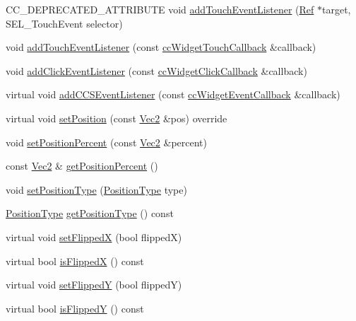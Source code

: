 \begin{DoxyCompactItemize}
\item 
C\+C\+\_\+\+D\+E\+P\+R\+E\+C\+A\+T\+E\+D\+\_\+\+A\+T\+T\+R\+I\+B\+U\+TE void \hyperlink{classui_1_1Widget_a5265726a03f69c3bc8dc65420070c41a}{add\+Touch\+Event\+Listener} (\hyperlink{classRef}{Ref} $\ast$target, S\+E\+L\+\_\+\+Touch\+Event selector)
\item 
void \hyperlink{classui_1_1Widget_a13169efe07b00813c563f56a5753acfe}{add\+Touch\+Event\+Listener} (const \hyperlink{classui_1_1Widget_a4f2987649ba5a33d1edb8b13279b03c9}{cc\+Widget\+Touch\+Callback} \&callback)
\item 
void \hyperlink{classui_1_1Widget_a840938728aeeca3152490620ab1952d1}{add\+Click\+Event\+Listener} (const \hyperlink{classui_1_1Widget_a01110bd071334e41c48ee0bec593db61}{cc\+Widget\+Click\+Callback} \&callback)
\item 
virtual void \hyperlink{classui_1_1Widget_adaea987f471ffaa56f1749befd7135b8}{add\+C\+C\+S\+Event\+Listener} (const \hyperlink{classui_1_1Widget_a15b83a56c3c29442ec103100b45e56c7}{cc\+Widget\+Event\+Callback} \&callback)
\item 
virtual void \hyperlink{classui_1_1Widget_a290404b9d89d66e9f5bc7225fe68f2b5}{set\+Position} (const \hyperlink{classVec2}{Vec2} \&pos) override
\item 
void \hyperlink{classui_1_1Widget_a6950cd713842c572b7934e41d1244e12}{set\+Position\+Percent} (const \hyperlink{classVec2}{Vec2} \&percent)
\item 
const \hyperlink{classVec2}{Vec2} \& \hyperlink{classui_1_1Widget_aa93b0b616c82ddb392678095bb34422b}{get\+Position\+Percent} ()
\item 
void \hyperlink{classui_1_1Widget_a243b1fe9cb8b404e0c79176a0a36d10d}{set\+Position\+Type} (\hyperlink{classui_1_1Widget_acfb8004ec169575dab6d3e8eb3e92b90}{Position\+Type} type)
\item 
\hyperlink{classui_1_1Widget_acfb8004ec169575dab6d3e8eb3e92b90}{Position\+Type} \hyperlink{classui_1_1Widget_a677e31ede510db02cd4781b32703ea95}{get\+Position\+Type} () const
\item 
virtual void \hyperlink{classui_1_1Widget_a0d01847eabfc17cf518c335d622ac23b}{set\+FlippedX} (bool flippedX)
\item 
virtual bool \hyperlink{classui_1_1Widget_aa21dc6a63ebb20bc0dc78293d0f03256}{is\+FlippedX} () const
\item 
virtual void \hyperlink{classui_1_1Widget_a4abd5fb73abbe7ba407f6fbb41e4ac4e}{set\+FlippedY} (bool flippedY)
\item 
virtual bool \hyperlink{classui_1_1Widget_a25f551f2348e0f7b953d682045b10325}{is\+FlippedY} () const

\end{DoxyCompactItemize}
